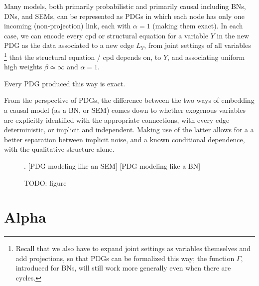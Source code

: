 \documentclass{article}
\newcommand{\N}{\mathcal N}
\newcommand{\Ed}{\mathcal A}
\newcommand{\dg}[1]{\mathsf #1}
\theoremstyle{plain}
\newtheorem{claim}[theorem]{Claim}
\theoremstyle{definition}
\newtheorem{defn}{Definition}
\theoremstyle{remark}
\begin{document}
Many models, both primarily probabilistic and primarily causal including BNs, DNs, and SEMs, can be represented as PDGs in which each node has only one incoming (non-projection) link, each with $\alpha=1$ (making them exact).%
In each case, we can encode every cpd or structural equation for a variable $Y$ in the new PDG as the data associated to a new edge $L_Y$, from joint settings of all variables%
		\footnote{Recall that we also have to expand joint settings as variables themselves and add projections, so that PDGs can be formalized this way; the function $\Gamma$, introduced for BNs, will still work more generally even when there are cycles.}
that the structural equation / cpd depends on, to $Y$, and associating uniform high weights $\beta \simeq \infty$ and $\alpha = 1$.%

Every PDG produced this way is exact.

From the perspective of PDGs, the difference between the two ways of embedding a causal model (as a BN, or SEM) comes down to whether exogenous variables are explicitly identified with the appropriate connections, with every edge deterministic, or implicit and independent. Making use of the latter allows for a a better separation between implicit noise, and a known conditional dependence, with the qualitative structure alone.


\begin{figure}.
	[PDG modeling like an SEM] [PDG modeling like a BN] 
	\caption{TODO: figure}
\end{figure}

%



\clearpage
\section{Alpha}
\end{document}
